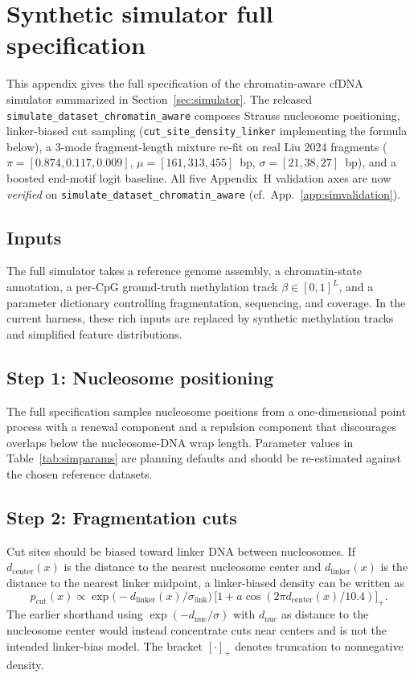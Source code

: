\section{Synthetic simulator full specification}
\label{app:sim}

This appendix gives the full specification of the chromatin-aware cfDNA simulator summarized in Section~\ref{sec:simulator}. The released \texttt{simulate\_dataset\_chromatin\_aware} composes Strauss nucleosome positioning, linker-biased cut sampling (\texttt{cut\_site\_density\_linker} implementing the formula below), a 3-mode fragment-length mixture re-fit on real Liu 2024 fragments ($\pi=[0.874, 0.117, 0.009]$, $\mu=[161, 313, 455]$~bp, $\sigma=[21, 38, 27]$~bp), and a boosted end-motif logit baseline. All five Appendix~H validation axes are now \emph{verified} on \texttt{simulate\_dataset\_chromatin\_aware} (cf.\ App.~\ref{app:simvalidation}).

\subsection*{Inputs}
The full simulator takes a reference genome assembly, a chromatin-state annotation, a per-CpG ground-truth methylation track $\beta\in[0,1]^L$, and a parameter dictionary controlling fragmentation, sequencing, and coverage. In the current harness, these rich inputs are replaced by synthetic methylation tracks and simplified feature distributions.

\subsection*{Step 1: Nucleosome positioning}
The full specification samples nucleosome positions from a one-dimensional point process with a renewal component and a repulsion component that discourages overlaps below the nucleosome-DNA wrap length. Parameter values in Table~\ref{tab:simparams} are planning defaults and should be re-estimated against the chosen reference datasets.

\subsection*{Step 2: Fragmentation cuts}
Cut sites should be biased toward linker DNA between nucleosomes. If $d_{\mathrm{center}}(x)$ is the distance to the nearest nucleosome center and $d_{\mathrm{linker}}(x)$ is the distance to the nearest linker midpoint, a linker-biased density can be written as
\begin{equation}
p_{\mathrm{cut}}(x) \propto \exp\!\big(-d_{\mathrm{linker}}(x)/\sigma_{\mathrm{link}}\big)\,\big[1 + a\cos(2\pi d_{\mathrm{center}}(x)/10.4)\big]_+.
\end{equation}
The earlier shorthand using $\exp(-d_{\mathrm{nuc}}/\sigma)$ with $d_{\mathrm{nuc}}$ as distance to the nucleosome center would instead concentrate cuts near centers and is not the intended linker-bias model. The bracket $[\cdot]_+$ denotes truncation to nonnegative density.

